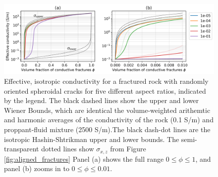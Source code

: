 \begin{figure}
    \begin{center}
    \includegraphics[width=\columnwidth]{figures/phys_prop_model/random_fractures.png}
    \end{center}
\caption{
    Effective, isotropic conductivity for a fractured rock with randomly oriented spheroidal
    cracks for five different aspect ratios, indicated by the legend. The black dashed lines show the upper and lower
    Wiener Bounds, which are identical the volume-weighted arithemtic and harmonic averages of the
    conductivity of the rock (0.1 S/m) and proppant-fluid mixture (2500 S/m).The black dash-dot lines
    are the isotropic Hashin-Shtrikman upper and lower bounds.
    The semi-transparent dotted lines show $\sigma_{x, z}$ from Figure \ref{fig:aligned_fractures}
    Panel (a) shows the
    full range $0 \leq \phi \leq 1$, and panel (b) zooms in to $0 \leq \phi \leq 0.01$.
}
\label{fig:random_fractures}
\end{figure}
